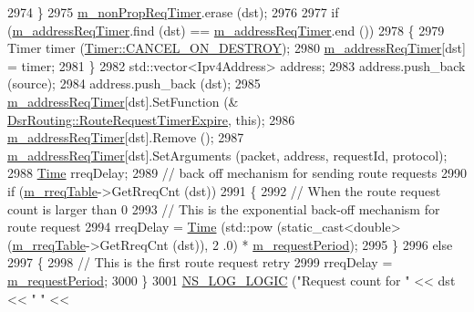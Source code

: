 \begin{DoxyCode}
2974         \}
2975       \hyperlink{classns3_1_1dsr_1_1DsrRouting_a0936df610f90f7e79c24a2a8cdea6c14}{m\_nonPropReqTimer}.erase (dst);
2976 
2977       \textcolor{keywordflow}{if} (\hyperlink{classns3_1_1dsr_1_1DsrRouting_a47174823b0622573b681afc40d6ea558}{m\_addressReqTimer}.find (dst) == \hyperlink{classns3_1_1dsr_1_1DsrRouting_a47174823b0622573b681afc40d6ea558}{m\_addressReqTimer}.end ())
2978         \{
2979           Timer timer (\hyperlink{classns3_1_1Timer_a816309b83cd2a35bea47d9bbc6bbf721a07a9dd5063b32fb6cf1f813c6ee7e28e}{Timer::CANCEL\_ON\_DESTROY});
2980           \hyperlink{classns3_1_1dsr_1_1DsrRouting_a47174823b0622573b681afc40d6ea558}{m\_addressReqTimer}[dst] = timer;
2981         \}
2982       std::vector<Ipv4Address> address;
2983       address.push\_back (source);
2984       address.push\_back (dst);
2985       \hyperlink{classns3_1_1dsr_1_1DsrRouting_a47174823b0622573b681afc40d6ea558}{m\_addressReqTimer}[dst].SetFunction (&
      \hyperlink{classns3_1_1dsr_1_1DsrRouting_aa839b89cdf568048c4d09941b59e46d4}{DsrRouting::RouteRequestTimerExpire}, \textcolor{keyword}{this});
2986       \hyperlink{classns3_1_1dsr_1_1DsrRouting_a47174823b0622573b681afc40d6ea558}{m\_addressReqTimer}[dst].Remove ();
2987       \hyperlink{classns3_1_1dsr_1_1DsrRouting_a47174823b0622573b681afc40d6ea558}{m\_addressReqTimer}[dst].SetArguments (packet, address, requestId, protocol);
2988       \hyperlink{namespacens3_1_1TracedValueCallback_a7ffd3e7c142ffe7c8a1d2db9b8de38ec}{Time} rreqDelay;
2989       \textcolor{comment}{// back off mechanism for sending route requests}
2990       \textcolor{keywordflow}{if} (\hyperlink{classns3_1_1dsr_1_1DsrRouting_ae9ec27743735fa2d59cc5190961d1942}{m\_rreqTable}->GetRreqCnt (dst))
2991         \{
2992           \textcolor{comment}{// When the route request count is larger than 0}
2993           \textcolor{comment}{// This is the exponential back-off mechanism for route request}
2994           rreqDelay = \hyperlink{namespacens3_1_1TracedValueCallback_a7ffd3e7c142ffe7c8a1d2db9b8de38ec}{Time} (std::pow (static\_cast<double> (\hyperlink{classns3_1_1dsr_1_1DsrRouting_ae9ec27743735fa2d59cc5190961d1942}{m\_rreqTable}->GetRreqCnt (dst)), 2
      .0) * \hyperlink{classns3_1_1dsr_1_1DsrRouting_acb19e2fe8a4cc1812181cdd5491383ee}{m\_requestPeriod});
2995         \}
2996       \textcolor{keywordflow}{else}
2997         \{
2998           \textcolor{comment}{// This is the first route request retry}
2999           rreqDelay = \hyperlink{classns3_1_1dsr_1_1DsrRouting_acb19e2fe8a4cc1812181cdd5491383ee}{m\_requestPeriod};
3000         \}
3001       \hyperlink{group__logging_ga88acd260151caf2db9c0fc84997f45ce}{NS\_LOG\_LOGIC} (\textcolor{stringliteral}{"Request count for "} << dst << \textcolor{stringliteral}{" "} << 

\end{DoxyCode}
